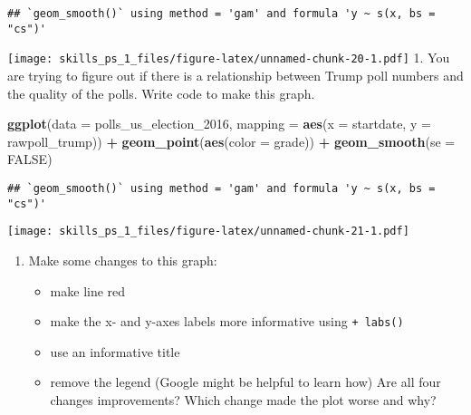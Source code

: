 \documentclass[
]{article}
\newenvironment{Shaded}{\begin{snugshade}}{\end{snugshade}}
\newcommand{\DataTypeTok}[1]{\textcolor[rgb]{0.13,0.29,0.53}{#1}}
\newcommand{\DecValTok}[1]{\textcolor[rgb]{0.00,0.00,0.81}{#1}}
\newcommand{\KeywordTok}[1]{\textcolor[rgb]{0.13,0.29,0.53}{\textbf{#1}}}
\newcommand{\NormalTok}[1]{#1}
\newcommand{\OperatorTok}[1]{\textcolor[rgb]{0.81,0.36,0.00}{\textbf{#1}}}
\newcommand{\OtherTok}[1]{\textcolor[rgb]{0.56,0.35,0.01}{#1}}
\newcommand{\StringTok}[1]{\textcolor[rgb]{0.31,0.60,0.02}{#1}}
\providecommand{\tightlist}{%
  \setlength{\itemsep}{0pt}\setlength{\parskip}{0pt}}
\begin{document}
\begin{verbatim}
## `geom_smooth()` using method = 'gam' and formula 'y ~ s(x, bs = "cs")'
\end{verbatim}

\texttt{[image: skills\_ps\_1\_files/figure-latex/unnamed-chunk-20-1.pdf]}
1. You are trying to figure out if there is a relationship between Trump
poll numbers and the quality of the polls. Write code to make this
graph.

\begin{Shaded}
\begin{Highlighting}[]
    \KeywordTok{ggplot}\NormalTok{(}\DataTypeTok{data =}\NormalTok{ polls_us_election_}\DecValTok{2016}\NormalTok{, }
           \DataTypeTok{mapping =} \KeywordTok{aes}\NormalTok{(}\DataTypeTok{x =}\NormalTok{ startdate, }
                         \DataTypeTok{y =}\NormalTok{ rawpoll_trump)) }\OperatorTok{+}
\StringTok{        }\KeywordTok{geom_point}\NormalTok{(}\KeywordTok{aes}\NormalTok{(}\DataTypeTok{color =}\NormalTok{ grade)) }\OperatorTok{+}
\StringTok{        }\KeywordTok{geom_smooth}\NormalTok{(}\DataTypeTok{se =} \OtherTok{FALSE}\NormalTok{)}
\end{Highlighting}
\end{Shaded}

\begin{verbatim}
## `geom_smooth()` using method = 'gam' and formula 'y ~ s(x, bs = "cs")'
\end{verbatim}

\texttt{[image: skills\_ps\_1\_files/figure-latex/unnamed-chunk-21-1.pdf]}

\begin{enumerate}
\def\labelenumi{\arabic{enumi}.}
\tightlist
\item
  Make some changes to this graph:

  \begin{itemize}
  \tightlist
  \item
    make line red
  \item
    make the x- and y-axes labels more informative using
    \texttt{+\ labs()}
  \item
    use an informative title
  \item
    remove the legend (Google might be helpful to learn how) Are all
    four changes improvements? Which change made the plot worse and why?
  \end{itemize}
\end{enumerate}
\end{document}
